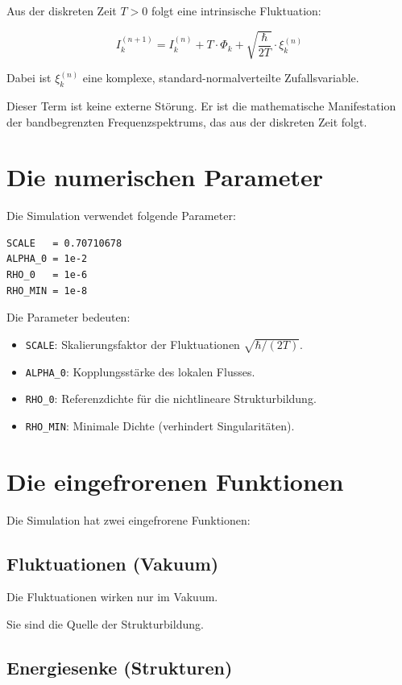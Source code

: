 Aus der diskreten Zeit \( T > 0 \) folgt eine intrinsische Fluktuation:

\[
I_k^{(n+1)} = I_k^{(n)} + T \cdot \Phi_k + \sqrt{\frac{\hbar}{2T}} \cdot \xi_k^{(n)}
\]

Dabei ist \( \xi_k^{(n)} \) eine komplexe, standard-normalverteilte Zufallsvariable.

Dieser Term ist keine externe Störung. Er ist die mathematische Manifestation der bandbegrenzten Frequenzspektrums, das aus der diskreten Zeit folgt.

\section{Die numerischen Parameter}

Die Simulation verwendet folgende Parameter:

\begin{verbatim}
SCALE   = 0.70710678
ALPHA_0 = 1e-2
RHO_0   = 1e-6
RHO_MIN = 1e-8
\end{verbatim}

Die Parameter bedeuten:

\begin{itemize}
\item \texttt{SCALE}: Skalierungsfaktor der Fluktuationen \( \sqrt{\hbar/(2T)} \).
\item \texttt{ALPHA\_0}: Kopplungsstärke des lokalen Flusses.
\item \texttt{RHO\_0}: Referenzdichte für die nichtlineare Strukturbildung.
\item \texttt{RHO\_MIN}: Minimale Dichte (verhindert Singularitäten).
\end{itemize}

\section{Die eingefrorenen Funktionen}

Die Simulation hat zwei eingefrorene Funktionen:

\subsection{Fluktuationen (Vakuum)}

Die Fluktuationen wirken nur im Vakuum.

Sie sind die Quelle der Strukturbildung.

\subsection{Energiesenke (Strukturen)}

